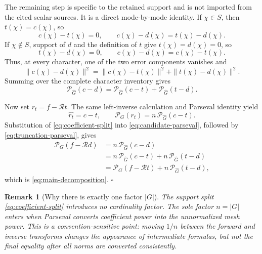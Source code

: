 \documentclass[11pt]{article}
\newtheorem{remark}{Remark}
\begin{document}
The remaining step is specific to the retained support and is not imported from the cited scalar
sources.  It is a direct mode-by-mode identity.  If $\chi\in S$, then $t(\chi)=c(\chi)$, so
\[
  c(\chi)-t(\chi)=0,
  \qquad
  c(\chi)-d(\chi)=t(\chi)-d(\chi).
\]
If $\chi\notin S$, support of $d$ and the definition of $t$ give $t(\chi)=d(\chi)=0$, so
\[
  t(\chi)-d(\chi)=0,
  \qquad
  c(\chi)-d(\chi)=c(\chi)-t(\chi).
\]
Thus, at every character, one of the two error components vanishes and
\begin{equation}
  \|c(\chi)-d(\chi)\|^2
  =\|c(\chi)-t(\chi)\|^2
   +\|t(\chi)-d(\chi)\|^2.
  \label{eq:mode-split}
\end{equation}
Summing over the complete character inventory gives
\begin{equation}
  \mathcal P_{\widehat G}(c-d)
  =\mathcal P_{\widehat G}(c-t)
   +\mathcal P_{\widehat G}(t-d).
  \label{eq:coefficient-split}
\end{equation}

Now set $r_t=f-\mathcal R t$.  The same left-inverse calculation and Parseval identity yield
\begin{equation}
  \widehat{r_t}=c-t,
  \qquad
  \mathcal P_G(r_t)=n\,\mathcal P_{\widehat G}(c-t).
  \label{eq:truncation-parseval}
\end{equation}
Substitution of \eqref{eq:coefficient-split} into \eqref{eq:candidate-parseval}, followed by
\eqref{eq:truncation-parseval}, gives
\begin{align*}
  \mathcal P_G(f-\mathcal R d)
  &=n\,\mathcal P_{\widehat G}(c-d)\\
  &=n\,\mathcal P_{\widehat G}(c-t)
    +n\,\mathcal P_{\widehat G}(t-d)\\
  &=\mathcal P_G(f-\mathcal R t)
    +n\,\mathcal P_{\widehat G}(t-d),
\end{align*}
which is \eqref{eq:main-decomposition}. \hfill$\square$

\begin{remark}[Why there is exactly one factor $|G|$]
The support split \eqref{eq:coefficient-split} introduces no cardinality factor.  The sole factor
$n=|G|$ enters when Parseval converts coefficient power into the unnormalized mesh power.  This is
a convention-sensitive point: moving $1/n$ between the forward and inverse transforms changes the
appearance of intermediate formulas, but not the final equality after all norms are converted
consistently.
\end{remark}
\end{document}
